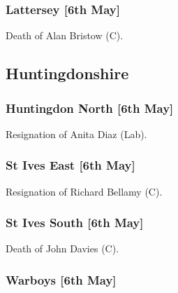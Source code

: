 \documentclass[a4paper,openany]{book}
\begin{document}
\begin{resultsiii}
\subsubsection*{Lattersey \hspace*{\fill}\nolinebreak[1]%
	\enspace\hspace*{\fill}
	[6th May]}


Death of Alan Bristow (C).

\subsection*{Huntingdonshire}

\subsubsection*{Huntingdon North \hspace*{\fill}\nolinebreak[1]%
	\enspace\hspace*{\fill}
	[6th May]}


Resignation of Anita Diaz (Lab).

\subsubsection*{St Ives East \hspace*{\fill}\nolinebreak[1]%
	\enspace\hspace*{\fill}
	[6th May]}


Resignation of Richard Bellamy (C).

\subsubsection*{St Ives South \hspace*{\fill}\nolinebreak[1]%
	\enspace\hspace*{\fill}
	[6th May]}


Death of John Davies (C).

\subsubsection*{Warboys \hspace*{\fill}\nolinebreak[1]%
	\enspace\hspace*{\fill}
	[6th May]}


\end{resultsiii}
\end{document}
